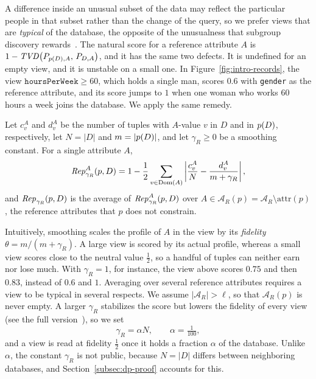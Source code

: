 A difference inside an unusual subset of the data may reflect the particular people in that subset rather than the change of the query, so we prefer views that are \emph{typical} of the database, the opposite of the unusualness that subgroup discovery rewards~\cite{Wrobel97,HerreraCGJ11}.
The natural score for a reference attribute $A$ is $1-\mathit{TVD}\big(P_{p(D),A},\,P_{D,A}\big)$, and it has the same two defects.
It is undefined for an empty view, and it is unstable on a small one. In Figure~\ref{fig:intro-records},
the view $\texttt{hoursPerWeek}\ge 60$, which holds a single man, scores $0.6$ with \texttt{gender} as the reference attribute, and its score jumps to $1$ when one woman who works $60$ hours a week joins the database.
We apply the same remedy.

\begin{definition}
\label{def:rep}
Let $c^A_v$ and $d^A_v$ be the number of tuples with $A$-value $v$ in $D$ and in $p(D)$, respectively, let $N=|D|$ and $m=|p(D)|$, and let $\gamma_R\ge0$ be a smoothing constant.
For a single attribute $A$,
\begin{equation}
\mathit{Rep}^A_{\gamma_R}(p,D)=1-\frac{1}{2}\sum_{v\in\operatorname{Dom}(A)}\left|\frac{c^A_v}{N}-\frac{d^A_v}{m+\gamma_R}\right| ,
\label{eq:representativeness-proxy}
\end{equation}
and $\mathit{Rep}_{\gamma_R}(p,D)$ is the average of $\mathit{Rep}^A_{\gamma_R}(p,D)$ over $A\in\mathcal{A}_R(p)=\mathcal{A}_R\setminus\mathrm{attr}(p)$, the reference attributes that $p$ does not constrain.
\end{definition}

Intuitively, smoothing scales the profile of $A$ in the view by its \emph{fidelity} $\theta=m/(m+\gamma_R)$.
A large view is scored by its actual profile, whereas a small view scores close to the neutral value $\tfrac12$, so a handful of tuples can neither earn nor lose much.
With $\gamma_R=1$, for instance, the view above scores $0.75$ and then $0.83$, instead of $0.6$ and $1$.
Averaging over several reference attributes requires a view to be typical in several respects.
We assume $|\mathcal{A}_R|>\ell$, so that $\mathcal{A}_R(p)$ is never empty.
A larger $\gamma_R$ stabilizes the score but lowers the fidelity of every view (see \ifpaper the full version~\cite{fullversion}\else {}\fi), so we set
\begin{equation}
\gamma_R=\alpha N,\qquad \alpha=\tfrac{1}{100},
\label{eq:gammaR-rule}
\end{equation}
and a view is read at fidelity $\tfrac12$ once it holds a fraction $\alpha$ of the database.
Unlike $\alpha$, the constant $\gamma_R$ is not public, because $N=|D|$ differs between neighboring databases, and Section~\ref{subsec:dp-proof} accounts for this.

